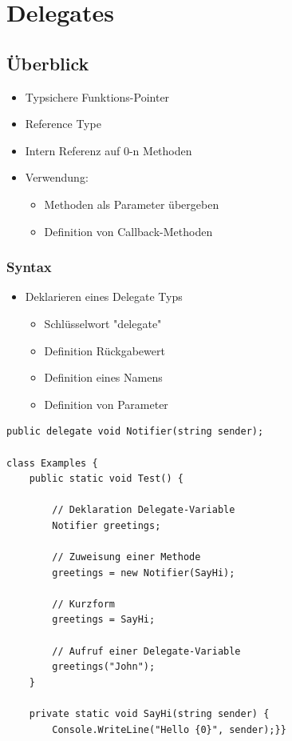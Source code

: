 
\section{Delegates}

\subsection{Überblick}
\begin{itemize}
    \item Typsichere Funktions-Pointer
    \item Reference Type
    \item Intern Referenz auf 0-n Methoden
    \item Verwendung:
    \begin{itemize}
        \item Methoden als Parameter übergeben
        \item Definition von Callback-Methoden
    \end{itemize}
\end{itemize}

\subsubsection{Syntax}
\begin{itemize}
    \item Deklarieren eines Delegate Typs
    \begin{itemize}
        \item Schlüsselwort "delegate"
        \item Definition Rückgabewert
        \item Definition eines Namens
        \item Definition von Parameter
    \end{itemize}
\end{itemize}

\begin{lstlisting}
public delegate void Notifier(string sender);

class Examples {
    public static void Test() {

        // Deklaration Delegate-Variable
        Notifier greetings;

        // Zuweisung einer Methode
        greetings = new Notifier(SayHi);

        // Kurzform
        greetings = SayHi;

        // Aufruf einer Delegate-Variable
        greetings("John");
    }

    private static void SayHi(string sender) {
        Console.WriteLine("Hello {0}", sender);}}
\end{lstlisting}

